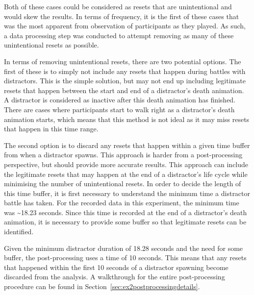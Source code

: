 Both of these cases could be considered as resets that are unintentional and would skew the results. In terms of frequency, it is the first of these cases that was the most apparent from observation of participants as they played. As such, a data processing step was conducted to attempt removing as many of these unintentional resets as possible. 

In terms of removing unintentional resets, there are two potential options. The first of these is to simply not include any resets that happen during battles with distractors. This is the simple solution, but may not end up including legitimate resets that happen between the start and end of a distractor's death animation. A distractor is considered as inactive after this death animation has finished. There are cases where participants start to walk right as a distractor's death animation starts, which means that this method is not ideal as it may miss resets that happen in this time range. 

The second option is to discard any resets that happen within a given time buffer from when a distractor spawns. This approach is harder from a post-processing perspective, but should provide more accurate results. This approach can include the legitimate resets that may happen at the end of a distractor's life cycle while minimising the number of unintentional resets. 
In order to decide the length of this time buffer, it is first necessary to understand the minimum time a distractor battle has taken. For the recorded data in this experiment, the minimum time was \textasciitilde18.23 seconds. Since this time is recorded at the end of a distractor's death animation, it is necessary to provide some buffer so that legitimate resets can be identified.

Given the minimum distractor duration of 18.28 seconds and the need for some buffer, the post-processing uses a time of 10 seconds. This means that any resets that happened within the first 10 seconds of a distractor spawning become discarded from the analysis. A walkthrough for the entire post-processing procedure can be found in Section~\ref{sec:ex2postprocessingdetails}.

